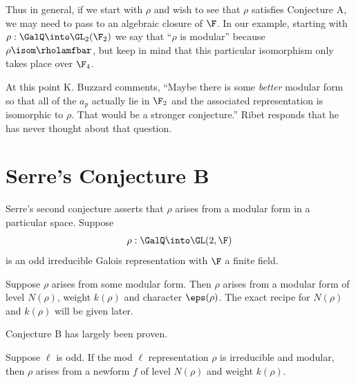 \documentclass{report}
\begin{document}
Thus in general, if we start with $\rho$ and wish to see that
$\rho$ satisfies Conjecture A, we may need to pass to an
algebraic closure of $\F$.
In our example, starting with $\rho:\GalQ\into\GL_2(\F_2)$
we say that ``$\rho$ is modular'' because
$\rho\isom\rholamfbar$, but keep in mind that
this particular isomorphism
only takes place over $\F_4$.

At this point K. Buzzard
comments,
``Maybe there is some {\em better} modular form so that all of the
$a_p$ actually lie in $\F_2$ and the associated representation
is isomorphic to $\rho$.  That would be a stronger conjecture.''
Ribet responds that he has never thought about that question.

\section{Serre's Conjecture B}
Serre's second conjecture asserts that $\rho$
arises from a modular form in a particular space.
Suppose
    $$\rho:\GalQ\into\GL(2,\F)$$
is an odd irreducible Galois representation
with $\F$ a finite field.
\begin{conjecture}
Suppose $\rho$ arises from some modular form.
Then $\rho$ arises from a modular form
of level $N(\rho)$, weight $k(\rho)$ and
character $\eps(\rho)$.
The exact recipe for $N(\rho)$ and $k(\rho)$ will be given
later.
\end{conjecture}
Conjecture B has largely been proven.
\begin{theorem} Suppose $\ell$ is odd. If the mod $\ell$ representation
$\rho$ is irreducible and modular, then $\rho$
arises from a newform $f$ of level $N(\rho)$
and weight $k(\rho)$.
\end{theorem}
\end{document}
